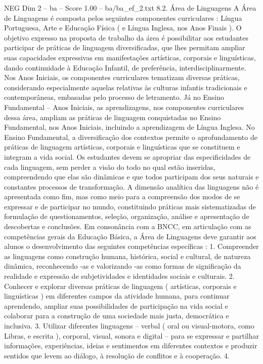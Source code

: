 \begin{textsample}{NEG Dim 2 – ba – Score 1.00 – ba/ba\_ef\_2.txt}  \label{ex:f2_neg_256}
8.2.
Área de Linguagens A Área de Linguagens é composta pelos seguintes componentes curriculares : Língua Portuguesa, Arte e Educação Física ( e Língua Inglesa, nos Anos Finais ).
O objetivo expresso na proposta de trabalho da área é possibilitar aos estudantes participar de práticas de linguagem diversificadas, que lhes permitam ampliar suas capacidades expressivas em manifestações artísticas, corporais e linguísticas, dando continuidade à Educação Infantil, de preferência, interdisciplinarmente.
Nos Anos Iniciais, os componentes curriculares tematizam diversas práticas, considerando especialmente aquelas relativas às culturas infantis tradicionais e contemporâneas, embasadas pelo processo de letramento.
Já no Ensino Fundamental – Anos Iniciais, as aprendizagens, nos componentes curriculares dessa área, ampliam as práticas de linguagem conquistadas no Ensino Fundamental, nos Anos Iniciais, incluindo a aprendizagem de Língua Inglesa.
No Ensino Fundamental, a diversificação dos contextos permite o aprofundamento de práticas de linguagem artísticas, corporais e linguísticas que se constituem e integram a vida social.
Os estudantes devem se apropriar das especificidades de cada linguagem, sem perder a visão do todo no qual estão inseridas, compreendendo que elas são dinâmicas e que todos participam dos seus naturais e constantes processos de transformação.
A dimensão analítica das linguagens não é apresentada como fim, mas como meio para a compreensão dos modos de se expressar e de participar no mundo, constituindo práticas mais sistematizadas de formulação de questionamentos, seleção, organização, análise e apresentação de descobertas e conclusões.
Em consonância com a BNCC, em articulação com as competências gerais da Educação Básica, a Área de Linguagens deve garantir aos alunos o desenvolvimento das seguintes competências específicas : 1.
Compreender as linguagens como construção humana, histórica, social e cultural, de natureza dinâmica, reconhecendo -as e valorizando -as como formas de significação da realidade e expressão de subjetividades e identidades sociais e culturais. 2.
Conhecer e explorar diversas práticas de linguagem ( artísticas, corporais e linguísticas ) em diferentes campos da atividade humana, para continuar aprendendo, ampliar suas possibilidades de participação na vida social e colaborar para a construção de uma sociedade mais justa, democrática e inclusiva. 3.
Utilizar diferentes linguagens – verbal ( oral ou visual-motora, como Libras, e escrita ), corporal, visual, sonora e digital – para se expressar e partilhar informações, experiências, ideias e sentimentos em diferentes contextos e produzir sentidos que levem ao diálogo, à resolução de conflitos e à cooperação. 4.

\end{textsample}
